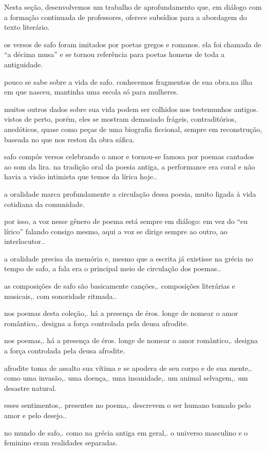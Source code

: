 \documentclass[12pt]{extarticle}
\begin{document}
Nesta seção, desenvolvemos um trabalho de aprofundamento que, em diálogo
com a formação continuada de professores, oferece subsídios para a
abordagem do texto literário.

os versos de safo foram imitados por poetas gregos e romanos. ela foi
chamada de ``a décima musa'' e se tornou referência para poetas homens
de toda a antiguidade.

pouco se sabe sobre a vida de safo. conhecemos fragmentos de sua obra.na ilha em que nasceu, mantinha uma escola só para mulheres.

muitos outros dados sobre sua vida podem ser colhidos nos testemunhos
antigos. vistos de perto, porém, eles se mostram demasiado frágeis,
contraditórios, anedóticos, quase como peças de uma biografia ficcional,
sempre em reconstrução, baseada no que nos restou da obra sáfica.

safo compôs versos celebrando o amor e tornou-se famosa por poemas
cantados ao som da lira. na tradição oral da poesia antiga, a
performance era coral e não havia a visão intimista que temos da lírica
hoje..

a oralidade marca profundamente a circulação dessa poesia, muito ligada
à vida cotidiana da comunidade.

por isso, a voz nesse gênero de poema está sempre em diálogo: em vez do
``eu lírico'' falando consigo mesmo, aqui a voz se dirige sempre ao
outro, ao interlocutor..

a oralidade precisa da memória e, mesmo que a escrita já existisse na
grécia no tempo de safo, a fala era o principal meio de circulação dos
poemas..

as composições de safo são basicamente canções,. composições literárias
e musicais,. com sonoridade ritmada..

nos poemas desta coleção,. há a presença de éros. longe de nomear o amor
romântico,. designa a força controlada pela deusa afrodite.

nos poemas,. há a presença de éros. longe de nomear o amor romântico,.
designa a força controlada pela deusa afrodite.


afrodite toma de assalto sua vítima e se apodera de seu corpo e de sua
mente,. como uma invasão,. uma doença,. uma insanidade,. um animal
selvagem,. um desastre natural.


esses sentimentos,. presentes no poema,. descrevem o ser humano tomado
pelo amor e pelo desejo..


no mundo de safo,. como na grécia antiga em geral,. o universo masculino
e o feminino eram realidades separadas.
\end{document}
